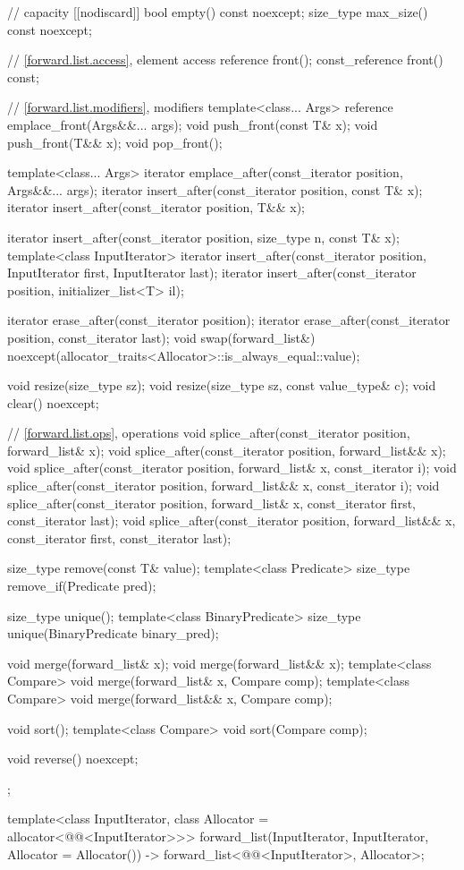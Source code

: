 \begin{codeblock}
{{    // capacity
    [[nodiscard]] bool empty() const noexcept;
    size_type max_size() const noexcept;

    // \ref{forward.list.access}, element access
    reference front();
    const_reference front() const;

    // \ref{forward.list.modifiers}, modifiers
    template<class... Args> reference emplace_front(Args&&... args);
    void push_front(const T& x);
    void push_front(T&& x);
    void pop_front();

    template<class... Args> iterator emplace_after(const_iterator position, Args&&... args);
    iterator insert_after(const_iterator position, const T& x);
    iterator insert_after(const_iterator position, T&& x);

    iterator insert_after(const_iterator position, size_type n, const T& x);
    template<class InputIterator>
      iterator insert_after(const_iterator position, InputIterator first, InputIterator last);
    iterator insert_after(const_iterator position, initializer_list<T> il);

    iterator erase_after(const_iterator position);
    iterator erase_after(const_iterator position, const_iterator last);
    void swap(forward_list&)
      noexcept(allocator_traits<Allocator>::is_always_equal::value);

    void resize(size_type sz);
    void resize(size_type sz, const value_type& c);
    void clear() noexcept;

    // \ref{forward.list.ops},  operations
    void splice_after(const_iterator position, forward_list& x);
    void splice_after(const_iterator position, forward_list&& x);
    void splice_after(const_iterator position, forward_list& x, const_iterator i);
    void splice_after(const_iterator position, forward_list&& x, const_iterator i);
    void splice_after(const_iterator position, forward_list& x,
                      const_iterator first, const_iterator last);
    void splice_after(const_iterator position, forward_list&& x,
                      const_iterator first, const_iterator last);

    size_type remove(const T& value);
    template<class Predicate> size_type remove_if(Predicate pred);

    size_type unique();
    template<class BinaryPredicate> size_type unique(BinaryPredicate binary_pred);

    void merge(forward_list& x);
    void merge(forward_list&& x);
    template<class Compare> void merge(forward_list& x, Compare comp);
    template<class Compare> void merge(forward_list&& x, Compare comp);

    void sort();
    template<class Compare> void sort(Compare comp);

    void reverse() noexcept;
  };

  template<class InputIterator, class Allocator = allocator<@@<InputIterator>>>
    forward_list(InputIterator, InputIterator, Allocator = Allocator())
      -> forward_list<@@<InputIterator>, Allocator>;
}
\end{codeblock}


